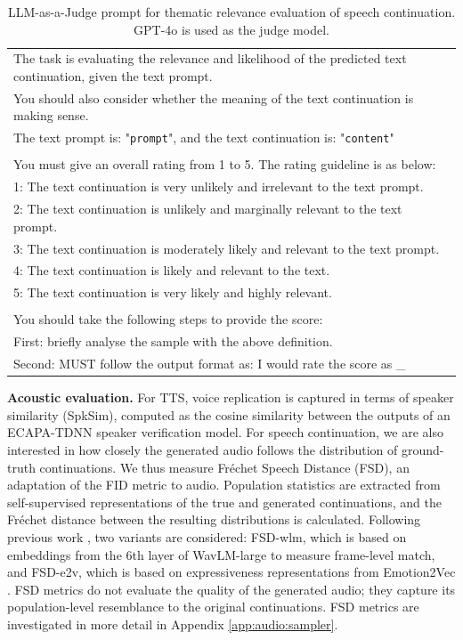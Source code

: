 \begin{table}[t]
\centering
\small
\setlength{\tabcolsep}{4.5pt}
\begin{tabular}{l}
\toprule
The task is evaluating the relevance and likelihood of the predicted text continuation, given the text prompt. \\ 
You should also consider whether the meaning of the text continuation is making sense. \\
The text prompt is: "\texttt{prompt}", and the text continuation is: "\texttt{content}" \\ \\

You must give an overall rating from 1 to 5. The rating guideline is as below: \\
1: The text continuation is very unlikely and irrelevant to the text prompt. \\
2: The text continuation is unlikely and marginally relevant to the text prompt. \\
3: The text continuation is moderately likely and relevant to the text prompt. \\
4: The text continuation is likely and relevant to the text. \\
5: The text continuation is very likely and highly relevant. \\ \\

You should take the following steps to provide the score: \\
First: briefly analyse the sample with the above definition. \\
Second: MUST follow the output format as: I would rate the score as \_ \\
\bottomrule
\end{tabular}
\caption{LLM-as-a-Judge prompt for thematic relevance evaluation of speech continuation. GPT-4o is used as the judge model.}
\label{tab:audio:llm-judge}
\end{table}

\textbf{Acoustic evaluation.} For TTS, voice replication is captured in terms of speaker similarity (SpkSim), computed as the cosine similarity between the outputs of an ECAPA-TDNN \citep{audio:ecapa-tdnn} speaker verification model. For speech continuation, we are also interested in how closely the generated audio follows the distribution of ground-truth continuations. We thus measure Fr\'echet Speech Distance (FSD), an adaptation of the FID metric to audio. Population statistics are extracted from self-supervised representations of the true and generated continuations, and the Fr\'echet distance between the resulting distributions is calculated. Following previous work \citep{audio:flow-slm}, two variants are considered: FSD-wlm, which is based on embeddings from the 6th layer of WavLM-large \citep{audio:wavlm} to measure frame-level match, and FSD-e2v, which is based on expressiveness representations from Emotion2Vec \citep{audio:emotion2vec}. FSD metrics do not evaluate the quality of the generated audio; they capture its population-level resemblance to the original continuations. FSD metrics are investigated in more detail in Appendix \ref{app:audio:sampler}.

